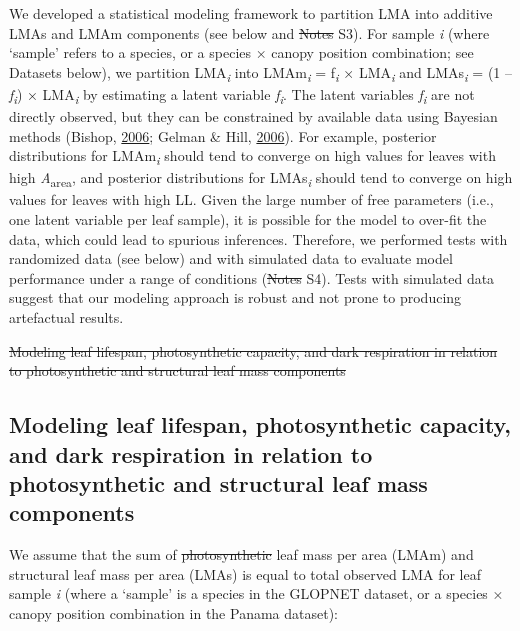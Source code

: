 \documentclass[12pt,]{article}
\theoremstyle{definition}
\theoremstyle{definition}
\theoremstyle{definition}
\theoremstyle{remark}
\providecommand{\DIFaddtex}[1]{{\protect\color{blue}\uwave{#1}}} %
\providecommand{\DIFdeltex}[1]{{\protect\color{red}\sout{#1}}}                      %
\providecommand{\DIFaddbegin}{} %
\providecommand{\DIFaddend}{} %
\providecommand{\DIFdelbegin}{} %
\providecommand{\DIFdelend}{} %
\providecommand{\DIFadd}[1]{\texorpdfstring{\DIFaddtex{#1}}{#1}} %
\providecommand{\DIFdel}[1]{\texorpdfstring{\DIFdeltex{#1}}{}} %
\newcommand{\DIFscaledelfig}{0.5}
\newlength{\DIFdelgraphicswidth} %
\newlength{\DIFdelgraphicsheight} %
\newcommand{\DIFaddincludegraphics}[2][]{{\color{blue}\fbox{\DIFOincludegraphics[#1]{#2}}}} %
\newcommand{\DIFdelincludegraphics}[2][]{%
\sbox{\DIFdelgraphicsbox}{\DIFOincludegraphics[#1]{#2}}%
\settoboxwidth{\DIFdelgraphicswidth}{\DIFdelgraphicsbox} %
\settoboxtotalheight{\DIFdelgraphicsheight}{\DIFdelgraphicsbox} %
\scalebox{\DIFscaledelfig}{%
\parbox[b]{\DIFdelgraphicswidth}{\usebox{\DIFdelgraphicsbox}\\[-\baselineskip] \rule{\DIFdelgraphicswidth}{0em}}\llap{\resizebox{\DIFdelgraphicswidth}{\DIFdelgraphicsheight}{%
\setlength{\unitlength}{\DIFdelgraphicswidth}%
\begin{picture}(1,1)%
\thicklines\linethickness{2pt} %
{\color[rgb]{1,0,0}\put(0,0){\framebox(1,1){}}}%
{\color[rgb]{1,0,0}\put(0,0){\line( 1,1){1}}}%
{\color[rgb]{1,0,0}\put(0,1){\line(1,-1){1}}}%
\end{picture}%
}\hspace*{3pt}}} %
} %
\DeclareRobustCommand{\DIFaddbegin}{\DIFOaddbegin \let\includegraphics\DIFaddincludegraphics} %
\DeclareRobustCommand{\DIFaddend}{\DIFOaddend \let\includegraphics\DIFOincludegraphics} %
\DeclareRobustCommand{\DIFdelbegin}{\DIFOdelbegin \let\includegraphics\DIFdelincludegraphics} %
\DeclareRobustCommand{\DIFdelend}{\DIFOaddend \let\includegraphics\DIFOincludegraphics} %
\begin{document}
\begin{itemize}
We developed a statistical modeling framework to partition LMA into
additive LMAs and LMAm components (see below and \DIFdelbegin \DIFdel{Notes }\DIFdelend \DIFaddbegin \DIFadd{Supplement }\DIFaddend S3). For
sample \emph{i} (where `sample' refers to a species, or a species ×
canopy position combination; see Datasets below), we partition
LMA\textsubscript{\emph{i}} into LMAm\textsubscript{\emph{i}} =
f\textsubscript{\emph{i}} × LMA\textsubscript{\emph{i}} and
LMAs\textsubscript{\emph{i}} = (1 -- \emph{f\textsubscript{i}}) ×
LMA\textsubscript{\emph{i}} by estimating a latent variable
\emph{f\textsubscript{i}}. The latent variables
\emph{f\textsubscript{i}} are not directly observed, but they can be
constrained by available data using Bayesian methods (Bishop,
\protect\hyperlink{ref-Bishop2006}{2006}; Gelman \& Hill,
\protect\hyperlink{ref-Gelman2006}{2006}). For example, posterior
distributions for LMAm\textsubscript{\emph{i}} should tend to converge
on high values for leaves with high \emph{A}\textsubscript{area}, and
posterior distributions for LMAs\textsubscript{\emph{i}} should tend to
converge on high values for leaves with high LL. Given the large number
of free parameters (i.e., one latent variable per leaf sample), it is
possible for the model to over-fit the data, which could lead to
spurious inferences. Therefore, we performed tests with randomized data
(see below) and with simulated data to evaluate model performance under
a range of conditions (\DIFdelbegin \DIFdel{Notes }\DIFdelend \DIFaddbegin \DIFadd{Supplement }\DIFaddend S4). Tests with simulated data suggest
that our modeling approach is robust and not prone to producing
artefactual results.

\DIFdelbegin \DIFdel{Modeling leaf lifespan, photosynthetic capacity, and dark respiration in
relation to photosynthetic and structural leaf mass components }\DIFdelend \DIFaddbegin \hypertarget{modeling-leaf-lifespan-photosynthetic-capacity-and-dark-respiration-in-relation-to-photosynthetic-and-structural-leaf-mass-components}{%
\subsection{Modeling leaf lifespan, photosynthetic capacity, and dark
respiration in relation to photosynthetic and structural leaf mass
components}\label{modeling-leaf-lifespan-photosynthetic-capacity-and-dark-respiration-in-relation-to-photosynthetic-and-structural-leaf-mass-components}}

\DIFaddend We assume that the sum of \DIFdelbegin \DIFdel{photosynthetic }\DIFdelend \DIFaddbegin \DIFadd{high metabolic }\DIFaddend leaf mass per area (LMAm) and
structural leaf mass per area (LMAs) is equal to total observed LMA for
leaf sample \emph{i} (where a `sample' is a species in the GLOPNET
dataset, or a species × canopy position combination in the Panama
dataset):


\end{itemize}
\end{document}
